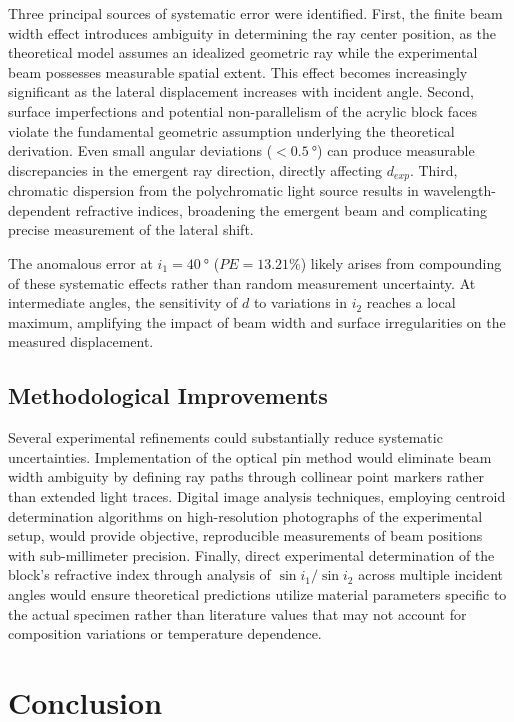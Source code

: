 \documentclass[12pt, a4paper]{article}
\begin{document}
Three principal sources of systematic error were identified. First, the finite beam width effect introduces ambiguity in determining the ray center position, as the theoretical model assumes an idealized geometric ray while the experimental beam possesses measurable spatial extent. This effect becomes increasingly significant as the lateral displacement increases with incident angle. Second, surface imperfections and potential non-parallelism of the acrylic block faces violate the fundamental geometric assumption underlying the theoretical derivation. Even small angular deviations ($<\SI{0.5}{\degree}$) can produce measurable discrepancies in the emergent ray direction, directly affecting $d_{exp}$. Third, chromatic dispersion from the polychromatic light source results in wavelength-dependent refractive indices, broadening the emergent beam and complicating precise measurement of the lateral shift.

The anomalous error at $i_1 = \SI{40}{\degree}$ ($PE = 13.21\%$) likely arises from compounding of these systematic effects rather than random measurement uncertainty. At intermediate angles, the sensitivity of $d$ to variations in $i_2$ reaches a local maximum, amplifying the impact of beam width and surface irregularities on the measured displacement.

\subsection{Methodological Improvements}

Several experimental refinements could substantially reduce systematic uncertainties. Implementation of the optical pin method would eliminate beam width ambiguity by defining ray paths through collinear point markers rather than extended light traces. Digital image analysis techniques, employing centroid determination algorithms on high-resolution photographs of the experimental setup, would provide objective, reproducible measurements of beam positions with sub-millimeter precision. Finally, direct experimental determination of the block's refractive index through analysis of $\sin i_1 / \sin i_2$ across multiple incident angles would ensure theoretical predictions utilize material parameters specific to the actual specimen rather than literature values that may not account for composition variations or temperature dependence.

\section{Conclusion}
\end{document}
